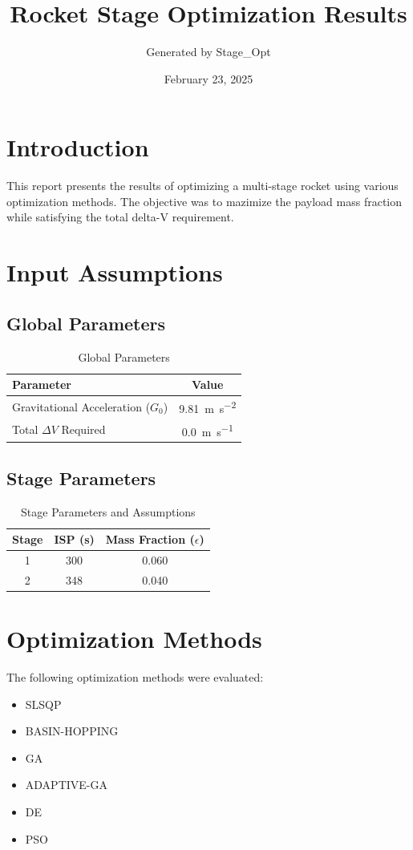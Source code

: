 \documentclass{article}
\title{Rocket Stage Optimization Results}
\author{Generated by Stage\_Opt}
\date{February 23, 2025}
\begin{document}
\maketitle

\section{Introduction}
This report presents the results of optimizing a multi-stage rocket using various optimization methods. The objective was to mazimize the payload mass fraction while satisfying the total delta-V requirement.

\section{Input Assumptions}
\subsection{Global Parameters}
\begin{table}[H]
\centering
\caption{Global Parameters}
\begin{tabular}{lS[table-format=4.2]}
\toprule
Parameter & {Value} \\
\midrule
Gravitational Acceleration ($G_0$) & \SI{9.81}{\meter\per\second\squared} \\
Total $\Delta V$ Required & \SI{0.0}{\meter\per\second} \\
\bottomrule
\end{tabular}
\end{table}

\subsection{Stage Parameters}
\begin{table}[H]
\centering
\caption{Stage Parameters and Assumptions}
\begin{tabular}{cS[table-format=3.0]S[table-format=1.3]}
\toprule
Stage & {ISP (\si{\second})} & {Mass Fraction ($\epsilon$)} \\
 & 300 & 0.060 \\
2 & 348 & 0.040 \\
\bottomrule
\end{tabular}
\end{table}

\section{Optimization Methods}
The following optimization methods were evaluated:
\begin{itemize}
\item SLSQP
\item BASIN-HOPPING
\item GA
\item ADAPTIVE-GA
\item DE
\item PSO
\end{itemize}
\end{document}
